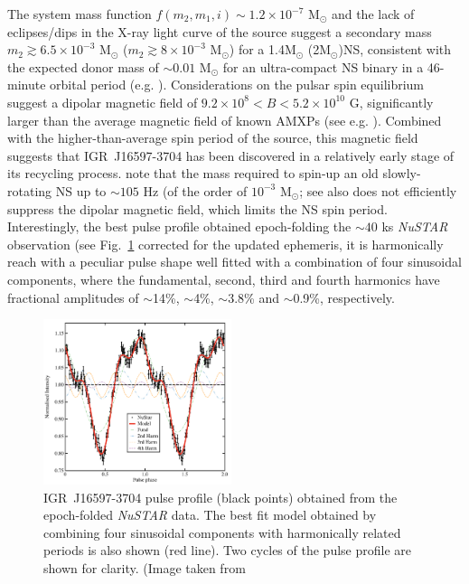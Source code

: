 \documentclass[graybox]{svmult}
\def \nustar{{\em NuSTAR\xspace}}
\begin{document}
The system mass function $f(m_2 ,m_1 ,i)\sim 1.2\times 10^{-7}$ M$_\odot$ and the lack of eclipses/dips in the X-ray light curve of the source suggest a secondary mass $m_2\gtrsim6.5\times 10^{-3}$ M$_\odot$ ($m_2\gtrsim8\times 10^{-3}$ M$_\odot$) for a 1.4M$_\odot$ (2M$_
\odot$)NS, consistent with the expected donor mass of $\sim0.01$ M$_\odot$ for an ultra-compact NS binary in a 46-minute orbital period (e.g. \cite{vanHaaften2012}). Considerations on the pulsar spin equilibrium suggest a dipolar magnetic field of $9.2\times 10^{8} < B < 5.2\times 10^{10}$ G, significantly larger than the average magnetic field of known AMXPs (see e.g. \cite{Mukherjee2015, Degenaar2017}). Combined with the higher-than-average spin period of the source, this magnetic field suggests that IGR~J16597-3704 has been discovered in a relatively early stage of its recycling process. \cite{Sanna2018a} note that the mass required to spin-up an old slowly-rotating NS up to $\sim105$ Hz (of the order of $10^{-3}$ M$_\odot$; see also \cite{Burderi1999} does not efficiently suppress the dipolar magnetic field, which limits the NS spin period.
Interestingly, the best pulse profile obtained epoch-folding the $\sim40$ ks \nustar{} observation (see Fig.~\ref{fig:16597} corrected for the updated ephemeris, it is harmonically reach with a peculiar pulse shape well fitted with a combination of four sinusoidal components, where the fundamental, second, third and fourth harmonics have fractional amplitudes of $\sim$14\%, $\sim$4\%, $\sim$3.8\% and $\sim$0.9\%, respectively. 
\begin{figure}
\centering
  \includegraphics[width=0.49\textwidth]{REVIEW_AMXP/pulse_profile_nustar_latest2.pdf}
  \caption{IGR~J16597-3704 pulse profile (black points) obtained from the epoch-folded \nustar{} data. The best fit model obtained by combining four sinusoidal components with harmonically related periods is also shown (red line).  
Two cycles of the pulse profile are shown for clarity. (Image taken from \cite{Sanna2018a}}     
\label{fig:16597}
\end{figure}
\end{document}
